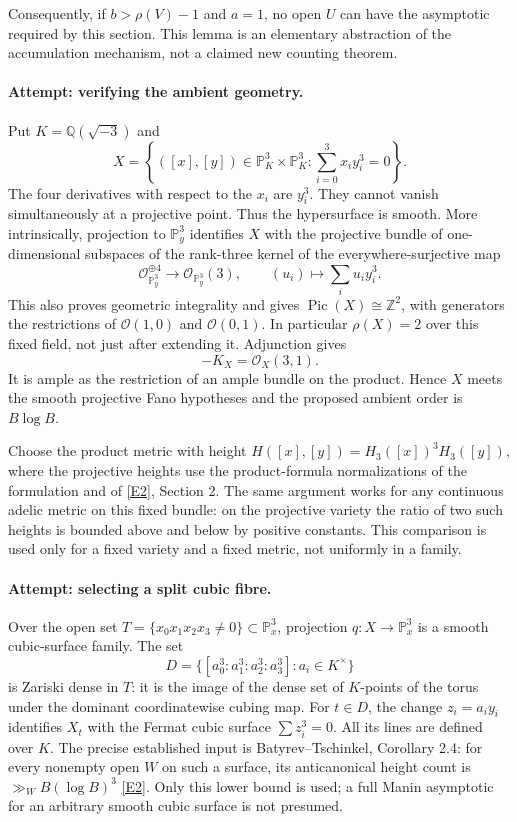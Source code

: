 \documentclass[11pt,a4paper]{article}
\newcommand{\Z}{\mathbb{Z}}
\newcommand{\Q}{\mathbb{Q}}
\newcommand{\PP}{\mathbb P}
\newcommand{\eref}[2]{\hyperlink{extra:#1:#2}{[E#2]}}
\numberwithin{equation}{section}
\begin{document}
Consequently, if $b>\rho(V)-1$ and $a=1$, no open $U$ can have the
asymptotic required by this section. This lemma is an elementary
abstraction of the accumulation mechanism, not a claimed new counting
theorem.

\paragraph{Attempt: verifying the ambient geometry.}
Put $K=\Q(\sqrt{-3})$ and
\begin{equation}\label{30006760:variety}
 X=\left\{([x],[y])\in\PP^3_K\times\PP^3_K:
           \sum_{i=0}^3x_i y_i^3=0\right\}.
\end{equation}
The four derivatives with respect to the $x_i$ are $y_i^3$. They cannot
vanish simultaneously at a projective point. Thus the hypersurface is
smooth. More intrinsically, projection to $\PP^3_y$ identifies $X$ with
the projective bundle of one-dimensional subspaces of the rank-three
kernel of the everywhere-surjective map
\[
 \mathcal O_{\PP^3_y}^{\oplus4}\longrightarrow
 \mathcal O_{\PP^3_y}(3),\qquad
 (u_i)\longmapsto\sum_i u_i y_i^3.
\]
This also proves geometric integrality and gives
$\operatorname{Pic}(X)\cong\Z^2$, with generators the restrictions of
$\mathcal O(1,0)$ and $\mathcal O(0,1)$. In particular $\rho(X)=2$ over
this fixed field, not just after extending it. Adjunction gives
\begin{equation}\label{30006760:anticanonical}
 -K_X=\mathcal O_X(3,1).
\end{equation}
It is ample as the restriction of an ample bundle on the product. Hence
$X$ meets the smooth projective Fano hypotheses and the proposed ambient
order is $B\log B$.

Choose the product metric with height
$H([x],[y])=H_3([x])^3H_3([y])$, where the projective heights use the
product-formula normalizations of the formulation and of
\eref{30006760}{2}, Section 2. The same argument works for any continuous
adelic metric on this fixed bundle: on the projective variety the ratio
of two such heights is bounded above and below by positive constants.
This comparison is used only for a fixed variety and a fixed metric, not
uniformly in a family.

\paragraph{Attempt: selecting a split cubic fibre.}
Over the open set $T=\{x_0x_1x_2x_3\ne0\}\subset\PP^3_x$, projection
$q:X\to\PP^3_x$ is a smooth cubic-surface family. The set
\[
 D=\{[a_0^3:a_1^3:a_2^3:a_3^3]:a_i\in K^\times\}
\]
is Zariski dense in $T$: it is the image of the dense set of $K$-points
of the torus under the dominant coordinatewise cubing map. For $t\in D$,
the change $z_i=a_i y_i$ identifies $X_t$ with the Fermat cubic surface
$\sum z_i^3=0$. All its lines are defined over $K$. The precise
established input is Batyrev--Tschinkel, Corollary 2.4: for every nonempty
open $W$ on such a surface, its anticanonical height count is
$\gg_W B(\log B)^3$ \eref{30006760}{2}. Only this lower bound is used; a full
Manin asymptotic for an arbitrary smooth cubic surface is not presumed.
\end{document}
